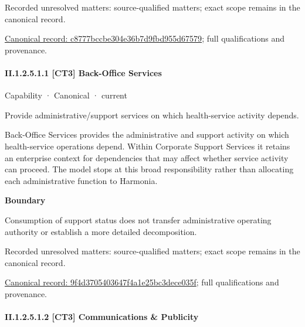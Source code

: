 {\small Recorded unresolved matters: source-qualified matters; exact scope remains in the canonical record.}\par
{\footnotesize \href{../../../../continuum/strategy/capability/c8777bccbe304e36b7d9fbd955d67579.md}{Canonical record: c8777bccbe304e36b7d9fbd955d67579}; full qualifications and provenance.}\par
\paragraph*{II.1.2.5.1.1 [CT3] Back-Office Services}
\label{navigation:II.1.2.5.1.1}

\label{element:9f4d3705403647f4a1e25bc3dece035f}
{\small Capability · Canonical · current}\par

Provide administrative/support services on which health-service activity depends.



Back-Office Services provides the administrative and support activity on which health-service operations depend. Within Corporate Support Services it retains an enterprise context for dependencies that may affect whether service activity can proceed. The model stops at this broad responsibility rather than allocating each administrative function to Harmonia.



\textbf{Boundary}



Consumption of support status does not transfer administrative operating authority or establish a more detailed decomposition.


{\small Recorded unresolved matters: source-qualified matters; exact scope remains in the canonical record.}\par
{\footnotesize \href{../../../../continuum/strategy/capability/9f4d3705403647f4a1e25bc3dece035f.md}{Canonical record: 9f4d3705403647f4a1e25bc3dece035f}; full qualifications and provenance.}\par
\paragraph*{II.1.2.5.1.2 [CT3] Communications \& Publicity}
\label{navigation:II.1.2.5.1.2}

